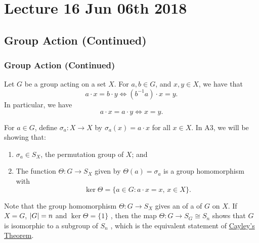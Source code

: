 \chapter{Lecture 16 Jun 06th 2018}%
\label{chp:lecture_16_jun_06th_2018}

\section{Group Action (Continued)}%
\label{sec:group_action_continued}

\subsection{Group Action (Continued)}%
\label{sub:group_action_continued}

\begin{remark}
  Let $G$ be a group acting on a set $X$. For $a, b \in G$, and $x, y \in X$, we have that
  \begin{equation*}
    a \cdot x = b \cdot y \iff (b^{-1} a) \cdot x = y.
  \end{equation*}
  In particular, we have
  \begin{equation*}
    a \cdot x = a \cdot y \iff x = y.
  \end{equation*}
\end{remark}

For $a \in G$, define $\sigma_a : X \to X$ by $\sigma_a(x) = a \cdot x$ for all $x \in X$. In A3, we will be showing that:
\begin{enumerate}
  \item $\sigma_a \in S_X$, the permutation group of $X$; and
  \item The function $\Theta : G \to S_X$ given by $\Theta(a) = \sigma_a$ is a group homomorphism with
    \begin{equation*}
      \ker \Theta = \{a \in G : a \cdot x = x, \, x \in X \}.
    \end{equation*}
\end{enumerate}

Note that the group homomorphism $\Theta : G \to S_X$ gives an  of a  of $G$ on $X$. If $X = G$, $\left|G\right| = n$ and $\ker \Theta = \{1\}$ , then the map $\Theta : G \to S_G \cong S_n$ shows that $G$ is isomorphic to a subgroup of $S_n$ , which is the equivalent statement of \hyperref[thm:cayley_s_theorem]{Cayley's Theorem}.

